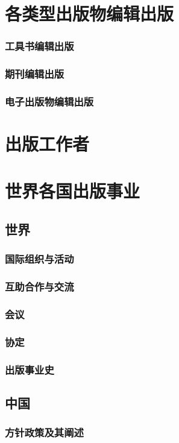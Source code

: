 \documentclass[UTF8]{../../ApplicationUniverse}
\begin{document}
    \section{各类型出版物编辑出版}
    \subsubsection{工具书编辑出版}
    \subsubsection{期刊编辑出版}
    \subsubsection{电子出版物编辑出版}

\section{出版工作者}
\section{世界各国出版事业}
    \subsection{世界}
        \subsubsection{国际组织与活动}
        \subsubsection{互助合作与交流}
        \subsubsection{会议}
        \subsubsection{协定}
        \subsubsection{出版事业史}
    \subsection{中国}
        \subsubsection{方针政策及其阐述}
\end{document}
